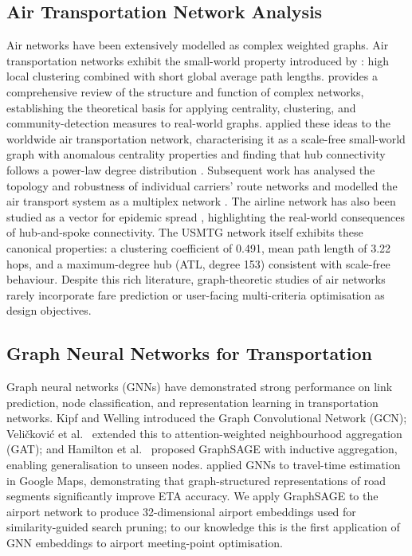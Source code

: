 \documentclass[review]{elsarticle}
\begin{document}
\subsection{Air Transportation Network Analysis}

Air networks have been extensively modelled as complex weighted graphs.
Air transportation networks exhibit the small-world property introduced by \citeauthor{watts1998} \cite{watts1998}: high local clustering combined with short global average path lengths.
\citeauthor{newman2003} \cite{newman2003} provides a comprehensive review of the structure and function of complex networks, establishing the theoretical basis for applying centrality, clustering, and community-detection measures to real-world graphs.
\citeauthor{guimera2005} \cite{guimera2005} applied these ideas to the worldwide air transportation network, characterising it as a scale-free small-world graph with anomalous centrality properties and finding that hub connectivity follows a power-law degree distribution \cite{barabasi1999}.
Subsequent work has analysed the topology and robustness of individual carriers' route networks \cite{lordan2014} and modelled the air transport system as a multiplex network \cite{zanin2013}.
The airline network has also been studied as a vector for epidemic spread \cite{colizza2006}, highlighting the real-world consequences of hub-and-spoke connectivity.
The USMTG network itself exhibits these canonical properties: a clustering coefficient of 0.491, mean path length of 3.22 hops, and a maximum-degree hub (ATL, degree 153) consistent with scale-free behaviour.
Despite this rich literature, graph-theoretic studies of air networks rarely incorporate fare prediction or user-facing multi-criteria optimisation as design objectives.

\subsection{Graph Neural Networks for Transportation}

Graph neural networks (GNNs) have demonstrated strong performance on link prediction, node classification, and representation learning in transportation networks.
Kipf and Welling \cite{kipf2017} introduced the Graph Convolutional Network (GCN); Veli\v{c}kovi\'{c} et al.\ \cite{velickovic2018} extended this to attention-weighted neighbourhood aggregation (GAT); and Hamilton et al.\ \cite{hamilton2017} proposed GraphSAGE with inductive aggregation, enabling generalisation to unseen nodes.
\citeauthor{derrow2021} \cite{derrow2021} applied GNNs to travel-time estimation in Google Maps, demonstrating that graph-structured representations of road segments significantly improve ETA accuracy.
We apply GraphSAGE to the airport network to produce 32-dimensional airport embeddings used for similarity-guided search pruning; to our knowledge this is the first application of GNN embeddings to airport meeting-point optimisation.
\end{document}
